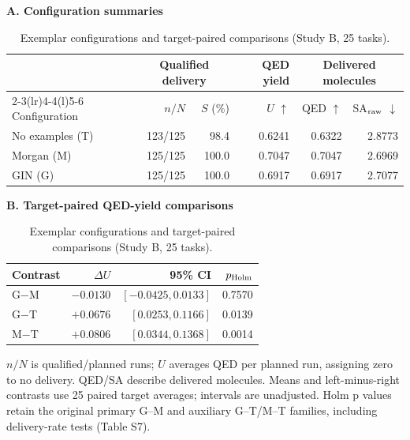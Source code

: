 \begin{table}[H]
\centering\small
\caption{Exemplar configurations and target-paired comparisons (Study B, 25 tasks).}
\label{tab:downstream}
\setlength{\tabcolsep}{4pt}
\renewcommand{\arraystretch}{1.12}
\noindent\textbf{A. Configuration summaries}\par\smallskip
\begin{tabular*}{\linewidth}{@{\extracolsep{\fill}}lrrrrr@{}}
\toprule
 & \multicolumn{2}{c}{Qualified delivery} & QED yield & \multicolumn{2}{c}{Delivered molecules} \\
\cmidrule(lr){2-3}\cmidrule(lr){4-4}\cmidrule(l){5-6}
Configuration & $n/N$ & $S$ (\%) & $U$ $\uparrow$ & QED $\uparrow$ & SA$_{\rm raw}$ $\downarrow$ \\
\midrule
No examples (T) & 123/125 & 98.4 & 0.6241 & 0.6322 & 2.8773 \\
Morgan (M) & 125/125 & 100.0 & 0.7047 & 0.7047 & 2.6969 \\
GIN (G) & 125/125 & 100.0 & 0.6917 & 0.6917 & 2.7077 \\
\bottomrule
\end{tabular*}
\par\medskip
\noindent\textbf{B. Target-paired QED-yield comparisons}\par\smallskip
\begin{tabular*}{\linewidth}{@{\extracolsep{\fill}}lrrr@{}}
\toprule
Contrast & $\Delta U$ & 95\% CI & $p_{\rm Holm}$ \\
\midrule
G$-$M & $-0.0130$ & $[-0.0425, 0.0133]$ & 0.7570 \\
\addlinespace
G$-$T & $+0.0676$ & $[0.0253, 0.1166]$ & 0.0139 \\
M$-$T & $+0.0806$ & $[0.0344, 0.1368]$ & 0.0014 \\
\bottomrule
\end{tabular*}
\par\smallskip
\begin{minipage}{\linewidth}\footnotesize
$n/N$ is qualified/planned runs; $U$ averages QED per planned run, assigning zero to no delivery. QED/SA describe delivered molecules. Means and left-minus-right contrasts use 25 paired target averages; intervals are unadjusted. Holm p values retain the original primary G--M and auxiliary G--T/M--T families, including delivery-rate tests (Table S7).
\end{minipage}
\end{table}
